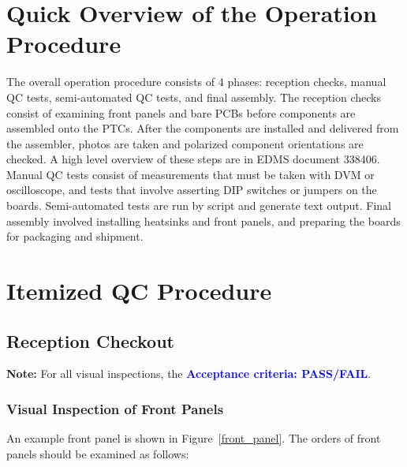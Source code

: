 \documentclass[a4paper,12pt]{article}
\begin{document}
\newpage

\section{Quick Overview of the Operation Procedure}
\label{section:overview}

The overall operation procedure consists of 4 phases: reception checks, manual QC tests, semi-automated QC tests, and final assembly. The reception checks consist of examining front panels and bare PCBs before components are assembled onto the PTCs. After the components are installed and delivered from the assembler, photos are taken and polarized component orientations are checked. A high level overview of these steps are in EDMS document 338406. Manual QC tests consist of measurements that must be taken with DVM or oscilloscope, and tests that involve asserting DIP switches or jumpers on the boards. Semi-automated tests are run by script and generate text output. Final assembly involved installing heatsinks and front panels, and preparing the boards for packaging and shipment.

\newpage


\section{Itemized QC Procedure}
\label{section:procedure}

\subsection{Reception Checkout}
\label{section:reception_checkout}

    \textbf{Note:} For all visual inspections, the \textcolor{blue}{\textbf{Acceptance criteria: PASS/FAIL}}.

\subsubsection{Visual Inspection of Front Panels}
\label{section:visual_inspection}

An example front panel is shown in Figure~\ref{front_panel}. The orders of front panels should be examined as follows:
\end{document}
